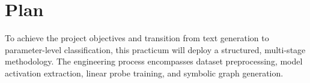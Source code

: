 \documentclass[12 pt]{article}  %
\begin{document}
\newpage
\section{Plan}
To achieve the project objectives and transition from text generation to parameter-level classification, this practicum will deploy a structured, multi-stage methodology. The engineering process encompasses dataset preprocessing, model activation extraction, linear probe training, and symbolic graph generation.
\end{document}
